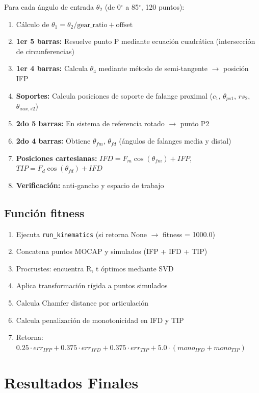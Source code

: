 \documentclass[11pt,letterpaper]{article}
\begin{document}
Para cada \'angulo de entrada $\theta_2$ (de 0$^\circ$ a 85$^\circ$, 120 puntos):
\begin{enumerate}
\item C\'alculo de $\theta_1 = \theta_2 / \text{gear\_ratio} + \text{offset}$
\item \textbf{1er 5 barras:} Resuelve punto P mediante ecuaci\'on cuadr\'atica (intersecci\'on de circunferencias)
\item \textbf{1er 4 barras:} Calcula $\theta_4$ mediante m\'etodo de semi-tangente $\rightarrow$ posici\'on IFP
\item \textbf{Soportes:} Calcula posiciones de soporte de falange proximal ($c_1$, $\theta_{ps1}$, $rs_2$, $\theta_{aux,s2}$)
\item \textbf{2do 5 barras:} En sistema de referencia rotado $\rightarrow$ punto P2
\item \textbf{2do 4 barras:} Obtiene $\theta_{fm}$, $\theta_{fd}$ (\'angulos de falanges media y distal)
\item \textbf{Posiciones cartesianas:} $IFD = F_m \cos(\theta_{fm}) + IFP$, $TIP = F_d \cos(\theta_{fd}) + IFD$
\item \textbf{Verificaci\'on:} anti-gancho y espacio de trabajo
\end{enumerate}

\subsection{Funci\'on fitness}
\begin{enumerate}
\item Ejecuta \texttt{run\_kinematics} (si retorna None $\rightarrow$ fitness = 1000.0)
\item Concatena puntos MOCAP y simulados (IFP + IFD + TIP)
\item Procrustes: encuentra R, t \'optimos mediante SVD
\item Aplica transformaci\'on r\'igida a puntos simulados
\item Calcula Chamfer distance por articulaci\'on
\item Calcula penalizaci\'on de monotonicidad en IFD y TIP
\item Retorna: $0.25 \cdot err_{IFP} + 0.375 \cdot err_{IFD} + 0.375 \cdot err_{TIP} + 5.0 \cdot (mono_{IFD} + mono_{TIP})$
\end{enumerate}

\section{Resultados Finales}
\end{document}
